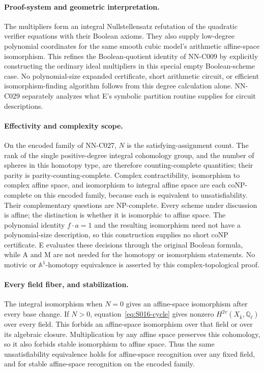 \paragraph{Proof-system and geometric interpretation.}
The multipliers form an integral Nullstellensatz refutation of the
quadratic verifier equations with their Boolean axioms. They also
supply low-degree polynomial coordinates for the same smooth cubic
model's arithmetic affine-space isomorphism. This refines the
Boolean-quotient identity of NN-C009 by explicitly constructing the
ordinary ideal multipliers in this special empty Boolean-scheme
case. No polynomial-size expanded certificate, short arithmetic
circuit, or efficient isomorphism-finding algorithm follows from
this degree calculation alone. NN-C029 separately analyzes what E's
symbolic partition routine supplies for circuit descriptions.

\paragraph{Effectivity and complexity scope.}
On the encoded family of NN-C027, $N$ is the satisfying-assignment
count. The rank of the single positive-degree integral cohomology
group, and the number of spheres in this homotopy type, are therefore
counting-complete quantities; their parity is parity-counting-complete.
Complex contractibility, isomorphism to complex affine space, and
isomorphism to integral affine space are each coNP-complete on this
encoded family, because each is equivalent to unsatisfiability.
Their complementary questions are NP-complete. Every scheme under
discussion is affine; the distinction is whether it is isomorphic
to affine space. The polynomial identity $f\cdot a=1$ and the
resulting isomorphism need not have a polynomial-size description,
so this construction supplies no short coNP certificate. E evaluates
these decisions through the original Boolean formula, while A and M
are not needed for the homotopy or isomorphism statements.
No motivic or $\mathbb A^1$-homotopy equivalence is asserted by this
complex-topological proof.


\paragraph{Every field fiber, and stabilization.}
The integral isomorphism when $N=0$ gives an affine-space isomorphism
after every base change. If $N>0$, equation~\eqref{eq:S016-cycle} gives
nonzero $H^{2v}(X_{\bar k},\mathbb Q_\ell)$ over every field. This
forbids an affine-space isomorphism over that field or over its algebraic
closure. Multiplication by any affine space preserves this cohomology,
so it also forbids stable isomorphism to affine space. Thus the same
unsatisfiability equivalence holds for affine-space recognition over any
fixed field, and for stable affine-space recognition on the encoded family.

